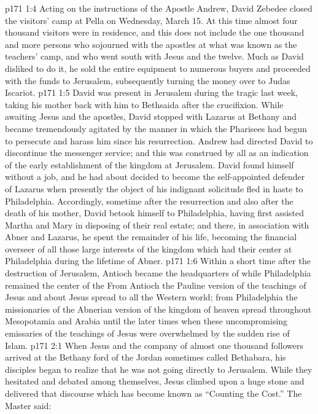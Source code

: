 \vs p171 1:4 Acting on the instructions of the Apostle Andrew, David Zebedee closed the visitors’ camp at Pella on Wednesday, March 15. At this time almost four thousand visitors were in residence, and this does not include the one thousand and more persons who sojourned with the apostles at what was known as the teachers’ camp, and who went south with Jesus and the twelve. Much as David disliked to do it, he sold the entire equipment to numerous buyers and proceeded with the funds to Jerusalem, subsequently turning the money over to Judas Iscariot.
\pc \vs p171 1:5 David was present in Jerusalem during the tragic last week, taking his mother back with him to Bethsaida after the crucifixion. While awaiting Jesus and the apostles, David stopped with Lazarus at Bethany and became tremendously agitated by the manner in which the Pharisees had begun to persecute and harass him since his resurrection. Andrew had directed David to discontinue the messenger service; and this was construed by all as an indication of the early establishment of the kingdom at Jerusalem. David found himself without a job, and he had about decided to become the self\hyp{}appointed defender of Lazarus when presently the object of his indignant solicitude fled in haste to Philadelphia. Accordingly, sometime after the resurrection and also after the death of his mother, David betook himself to Philadelphia, having first assisted Martha and Mary in disposing of their real estate; and there, in association with Abner and Lazarus, he spent the remainder of his life, becoming the financial overseer of all those large interests of the kingdom which had their center at Philadelphia during the lifetime of Abner.\plusone
\vs p171 1:6 Within a short time after the destruction of Jerusalem, Antioch became the headquarters of  while Philadelphia remained the center of the  From Antioch the Pauline version of the teachings of Jesus and about Jesus spread to all the Western world; from Philadelphia the missionaries of the Abnerian version of the kingdom of heaven spread throughout Mesopotamia and Arabia until the later times when these uncompromising emissaries of the teachings of Jesus were overwhelmed by the sudden rise of Islam.
\vs p171 2:1 When Jesus and the company of almost one thousand followers arrived at the Bethany ford of the Jordan sometimes called Bethabara, his disciples began to realize that he was not going directly to Jerusalem. While they hesitated and debated among themselves, Jesus climbed upon a huge stone and delivered that discourse which has become known as “Counting the Cost.” The Master said:
